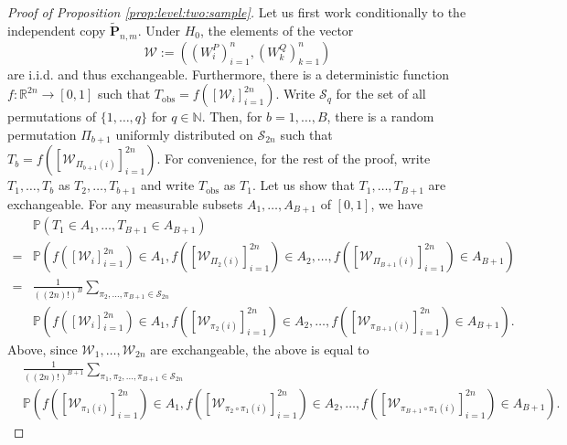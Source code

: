 \documentclass{imsart}
\numberwithin{equation}{section}
\begin{document}
\begin{proof}[Proof of Proposition \ref{prop:level:two:sample}]
	
	Let us first work conditionally to the independent copy
	$\widetilde{\mathbf{P}}_{n,m}$.  
	Under $H_0$, the elements of the vector 
	\begin{equation*}
		\mathcal{W} := (( W^P_i)_{i=1}^n ,  ( W^Q_k )_{k=1}^n) 
	\end{equation*}
	are i.i.d. and thus exchangeable. 
	Furthermore, there is a deterministic function $f : \mathbb{R}^{2n} \to [0,1]$ such that $    T_{\text{obs}} = f(  [\mathcal{W}_i]_{i=1}^{2n} )$. 	
	Write $\mathcal{S}_q$ for the set of all permutations of $\{1 , \dots , q\}$ for $q \in \mathbb{N}$.
	Then, for $b=1,\ldots,B$, there is a random permutation $\Pi_{b+1}$ uniformly distributed on $\mathcal{S}_{2n}$ such that  $T_{b} = f(  [\mathcal{W}_{\Pi_{b+1}(i)}]_{i=1}^{2n} )$. For convenience, for the rest of the proof,
	write $T_1,\ldots,T_{b}$ as $T_2,\ldots,T_{b+1}$ and write $T_{\text{obs}}$  as $T_1$. Let us show that $T_1,\ldots,T_{B+1}$ are exchangeable. For any measurable subsets $A_1 , \ldots, A_{B+1}$ of $[0,1]$, we have
	\begin{align*}
		& \mathbb{P} \left( 
		T_1 \in A_1 , \dots, T_{B+1} \in A_{B+1}
		\right) 
		\\
		=& 
		\mathbb{P} \left( 
		f(  [\mathcal{W}_i]_{i=1}^{2n} ) \in A_1
		, 
		f(  [\mathcal{W}_{\Pi_{2}(i)}]_{i=1}^{2n} ) \in A_2
		,
		\dots, 
		f(  [\mathcal{W}_{\Pi_{B+1}(i)}]_{i=1}^{2n} ) \in A_{B+1}
		\right) 
		\\ 
		=& 
		\frac{1}{ ((2n)!)^B }
		\sum_{\pi_2,\dots,\pi_{B+1} \in \mathcal{S}_{2n} }
		\\
		& 
		\mathbb{P} \left( 
		f(  [\mathcal{W}_i]_{i=1}^{2n} ) \in A_1
		, 
		f(  [\mathcal{W}_{\pi_{2}(i)}]_{i=1}^{2n} ) \in A_2
		,
		\dots, 
		f(  [\mathcal{W}_{\pi_{B+1}(i)}]_{i=1}^{2n} ) \in A_{B+1}
		\right).
	\end{align*}
	Above, since $\mathcal{W}_1, \ldots, \mathcal{W}_{2n}$ are exchangeable, the above is equal to
	\begin{align*}
		&	\frac{1}{ ((2n)!)^{B+1} }
		\sum_{\pi_1, \pi_2,\dots,\pi_{B+1} \in \mathcal{S}_{2n} }
		\\
		&	\mathbb{P} \left( 
		f(  [\mathcal{W}_{ \pi_1(i) }]_{i=1}^{2n} ) \in A_1
		, 
		f(  [\mathcal{W}_{\pi_{2} \circ \pi_1(i)}]_{i=1}^{2n} ) \in A_2
		,
		\dots, 
		f(  [\mathcal{W}_{\pi_{B+1} \circ \pi_1 (i)}]_{i=1}^{2n} ) \in A_{B+1}
		\right).
	\end{align*}

\end{proof}
\end{document}
